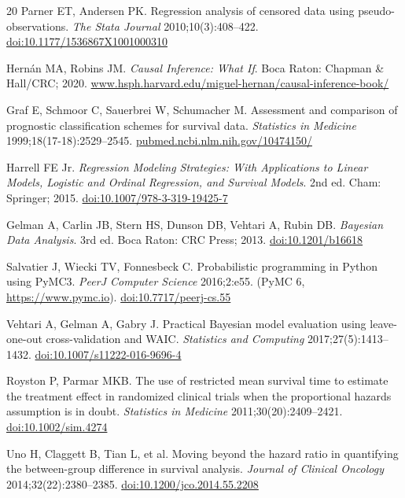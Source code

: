 \begin{thebibliography}{20}
Parner ET, Andersen PK.
Regression analysis of censored data using pseudo-observations.
\emph{The Stata Journal} 2010;10(3):408--422. \href{https://doi.org/10.1177/1536867X1001000310}{doi:10.1177/1536867X1001000310}


Hern{\'a}n MA, Robins JM.
\emph{Causal Inference: What If}.
Boca Raton: Chapman \& Hall/CRC; 2020. \href{https://www.hsph.harvard.edu/miguel-hernan/causal-inference-book/}{www.hsph.harvard.edu/miguel-hernan/causal-inference-book/}


Graf E, Schmoor C, Sauerbrei W, Schumacher M.
Assessment and comparison of prognostic classification schemes for
survival data.
\emph{Statistics in Medicine} 1999;18(17-18):2529--2545. \href{https://pubmed.ncbi.nlm.nih.gov/10474150/}{pubmed.ncbi.nlm.nih.gov/10474150/}


Harrell FE Jr.
\emph{Regression Modeling Strategies: With Applications to Linear
Models, Logistic and Ordinal Regression, and Survival Models}.
2nd ed. Cham: Springer; 2015. \href{https://doi.org/10.1007/978-3-319-19425-7}{doi:10.1007/978-3-319-19425-7}


Gelman A, Carlin JB, Stern HS, Dunson DB, Vehtari A, Rubin DB.
\emph{Bayesian Data Analysis}. 3rd ed. Boca Raton: CRC Press; 2013. \href{https://doi.org/10.1201/b16618}{doi:10.1201/b16618}


Salvatier J, Wiecki TV, Fonnesbeck C.
Probabilistic programming in Python using PyMC3.
\emph{PeerJ Computer Science} 2016;2:e55.
(PyMC 6, \url{https://www.pymc.io}). \href{https://doi.org/10.7717/peerj-cs.55}{doi:10.7717/peerj-cs.55}


Vehtari A, Gelman A, Gabry J.
Practical Bayesian model evaluation using leave-one-out cross-validation
and WAIC.
\emph{Statistics and Computing} 2017;27(5):1413--1432. \href{https://doi.org/10.1007/s11222-016-9696-4}{doi:10.1007/s11222-016-9696-4}


Royston P, Parmar MKB.
The use of restricted mean survival time to estimate the treatment
effect in randomized clinical trials when the proportional hazards
assumption is in doubt.
\emph{Statistics in Medicine} 2011;30(20):2409--2421. \href{https://doi.org/10.1002/sim.4274}{doi:10.1002/sim.4274}


Uno H, Claggett B, Tian L, et al.
Moving beyond the hazard ratio in quantifying the between-group
difference in survival analysis.
\emph{Journal of Clinical Oncology} 2014;32(22):2380--2385. \href{https://doi.org/10.1200/jco.2014.55.2208}{doi:10.1200/jco.2014.55.2208}

\end{thebibliography}


